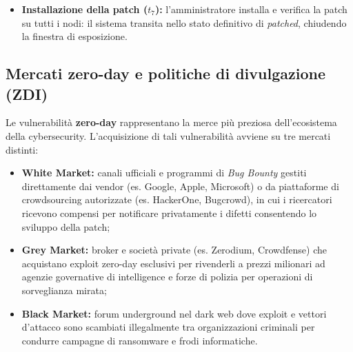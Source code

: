 \documentclass[../../main.tex]{subfiles}
\begin{document}
\begin{itemize}
    Nel momento esatto in cui un fornitore rilascia un aggiornamento binario, i gruppi criminali scaricano la patch ed eseguono una procedura automatizzata di \textbf{Binary Diffing / Patch Diffing} (confrontando byte per byte il codice binario dell'eseguibile precedente con quello aggiornato). Tramite questo reverse engineering mirato, gli attaccanti individuano in poche ore la funzione modificata, deducono l'errore originario, identificano la vulnerabilità e creano rapidamente un exploit funzionante (denominato \textbf{1-Day Exploit}). Poiché una vasta porzione di aziende e utenti finali impiega settimane o mesi per testare e installare la patch, la finestra immediatamente successiva al rilascio è caratterizzata da una proliferazione massiva di attacchi automatizzati contro i sistemi non ancora aggiornati.
    
    \item \textbf{Installazione della patch ($t_7$):} l'amministratore installa e verifica la patch su tutti i nodi: il sistema transita nello stato definitivo di \textit{patched}, chiudendo la finestra di esposizione.
\end{itemize}

\subsection{Mercati zero-day e politiche di divulgazione (ZDI)}
Le vulnerabilità \textbf{zero-day} rappresentano la merce più preziosa dell'ecosistema della cybersecurity. L'acquisizione di tali vulnerabilità avviene su tre mercati distinti:
\begin{itemize}
    \item \textbf{White Market:} canali ufficiali e programmi di \textit{Bug Bounty} gestiti direttamente dai vendor (es. Google, Apple, Microsoft) o da piattaforme di crowdsourcing autorizzate (es. HackerOne, Bugcrowd), in cui i ricercatori ricevono compensi per notificare privatamente i difetti consentendo lo sviluppo della patch;
    \item \textbf{Grey Market:} broker e società private (es. Zerodium, Crowdfense) che acquistano exploit zero-day esclusivi per rivenderli a prezzi milionari ad agenzie governative di intelligence e forze di polizia per operazioni di sorveglianza mirata;
    \item \textbf{Black Market:} forum underground nel dark web dove exploit e vettori d'attacco sono scambiati illegalmente tra organizzazioni criminali per condurre campagne di ransomware e frodi informatiche.
\end{itemize}
\end{document}
